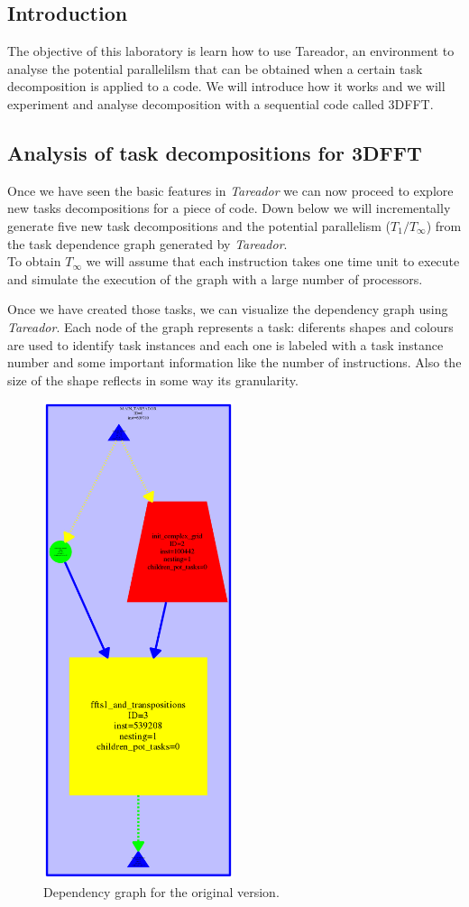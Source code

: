 \documentclass[12]{article}
\begin{document}
\subsection{Introduction}
The objective of this laboratory is learn how to use Tareador, an environment to analyse the potential parallelilsm that can be obtained when a certain task decomposition is applied to a code. We will introduce how it works and we will experiment and analyse decomposition with a sequential code called 3DFFT.

\subsection{Analysis of task decompositions for 3DFFT}

Once we have seen the basic features in \textit{Tareador} we can now proceed to explore new tasks decompositions for a piece of code. Down below we will incrementally generate five new task decompositions and the potential parallelism ($T_1 / T_\infty$) from the task dependence graph generated by \textit{Tareador}. 
\\
To obtain $T_\infty$ we will assume that each instruction takes one time unit to execute and simulate the execution of the graph with a large number of processors.

Once we have created those tasks, we can visualize the dependency graph using \textit{Tareador}. Each node of the graph represents a task: diferents shapes and colours are used to identify task instances and each one is labeled with a task instance number and some important information like the number of instructions. Also the size of the shape reflects in some way its granularity. 
 
\begin{figure}[H]
\centering  \includegraphics[width=.8\linewidth, height=14cm, width=6cm]{dependency_graph0.png}
  \caption{Dependency graph for the original version.}
  \label{fig:Depencency0}
\end{figure}
\end{document}
